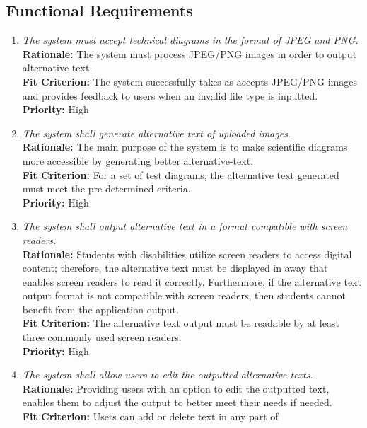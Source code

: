 \documentclass[12pt]{article}
\begin{document}
\subsection{Functional Requirements}
\begin{enumerate}[label=FR \arabic*., wide=0pt, leftmargin=*]
  \item \emph{The system must accept technical diagrams in the format
    of JPEG and PNG.}\\[2mm]
    {\bf Rationale:} The system must process JPEG/PNG images in order
    to output alternative text. \\
    {\bf Fit Criterion:} The system successfully takes as accepts
    JPEG/PNG images and provides feedback to users when an invalid
    file type is inputted.  \\
    {\bf Priority:} High
  \item \emph{The system shall generate alternative text of uploaded
    images.}\\[2mm]
    {\bf Rationale:} The main purpose of the system is to make
    scientific diagrams more accessible by generating better
    alternative-text. \\
    {\bf Fit Criterion:} For a set of test diagrams, the alternative
    text generated must meet the pre-determined criteria.\\
    {\bf Priority:} High
  \item \emph{The system shall output alternative text in a format
    compatible with screen readers.}\\[2mm]
    {\bf Rationale:} Students with disabilities utilize screen
    readers to access digital content; therefore, the alternative
    text must be displayed in away that enables screen readers to
    read it correctly. Furthermore, if the alternative text output
    format is not compatible with screen readers, then students
    cannot benefit from the application output.\\
    {\bf Fit Criterion:} The alternative text output must be readable
    by at least three commonly used screen readers.\\
    {\bf Priority:} High
  \item \emph{The system shall allow users to edit the outputted
    alternative texts.}\\[2mm]
    {\bf Rationale:} Providing users with an option to edit the
    outputted text, enables them to adjust the output to better meet
    their needs if needed.\\
    {\bf Fit Criterion:} Users can add or delete text in any part of

\end{enumerate}
\end{document}
